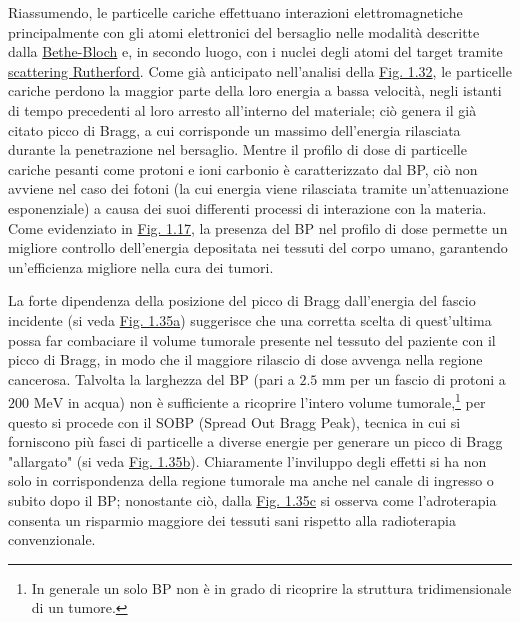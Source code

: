 \documentclass[12pt,a4paper,twoside]{report}
\begin{document}
	Riassumendo, le particelle cariche effettuano interazioni elettromagnetiche principalmente con gli atomi elettronici del bersaglio nelle modalità descritte dalla \hyperref[par:bethe_bloch]{Bethe-Bloch} e, in secondo luogo, con i nuclei degli atomi del target tramite \hyperref[par:scattering_Rutherford]{scattering Rutherford}. Come già anticipato nell'analisi della \hyperref[fig:bethe_bloch]{Fig. 1.32}, le particelle cariche perdono la maggior parte della loro energia a bassa velocità, negli istanti di tempo precedenti al loro arresto all'interno del materiale; ciò genera il già citato picco di Bragg, a cui corrisponde un massimo dell'energia rilasciata durante la penetrazione nel bersaglio. Mentre il profilo di dose di particelle cariche pesanti come protoni e ioni carbonio è caratterizzato dal BP, ciò non avviene nel caso dei fotoni (la cui energia viene rilasciata tramite un'attenuazione esponenziale) a causa dei suoi differenti processi di interazione con la materia. Come evidenziato in \hyperref[fig:photon]{Fig. 1.17}, la presenza del BP nel profilo di dose permette un migliore controllo dell'energia depositata nei tessuti del corpo umano, garantendo un'efficienza migliore nella cura dei tumori.
	
	La forte dipendenza della posizione del picco di Bragg dall'energia del fascio incidente (si veda \hyperref[fig:bragg_peak_energies]{Fig. 1.35a}) suggerisce che una corretta scelta di quest'ultima possa far combaciare il volume tumorale presente nel tessuto del paziente con il picco di Bragg, in modo che il maggiore rilascio di dose avvenga nella regione cancerosa. Talvolta la larghezza del BP (pari a $2.5\mbox{ mm}$ per un fascio di protoni a $200\mbox{ MeV}$ in acqua) non è sufficiente a ricoprire l'intero volume tumorale,\footnote{In generale un solo BP non è in grado di ricoprire la struttura tridimensionale di un tumore.} per questo si procede con il SOBP (Spread Out Bragg Peak), tecnica in cui si forniscono più fasci di particelle a diverse energie per generare un picco di Bragg "allargato" (si veda \hyperref[fig:sobp]{Fig. 1.35b}). Chiaramente l'inviluppo degli effetti si ha non solo in corrispondenza della regione tumorale ma anche nel canale di ingresso o subito dopo il BP; nonostante ciò, dalla \hyperref[fig:critical_organ]{Fig. 1.35c} si osserva come l'adroterapia consenta un risparmio maggiore dei tessuti sani rispetto alla radioterapia convenzionale.
		
\end{document}
